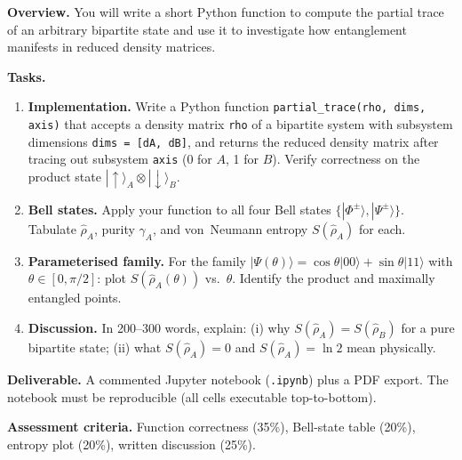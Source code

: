 \documentclass[11pt,a4paper]{article}
\begin{document}
\begin{tcolorbox}[ugprobbox, title={Project J2 --- Numerical Exploration of Partial Traces}]

\textbf{Overview.}
You will write a short Python function to compute the partial trace of an
arbitrary bipartite state and use it to investigate how entanglement
manifests in reduced density matrices.

\medskip\textbf{Tasks.}
\begin{enumerate}[leftmargin=1.8em, label=\textbf{\arabic*.}, itemsep=6pt]
  \item \textbf{Implementation.}
        Write a Python function \texttt{partial\_trace(rho, dims, axis)}
        that accepts a density matrix \texttt{rho} of a bipartite system
        with subsystem dimensions \texttt{dims = [dA, dB]}, and returns
        the reduced density matrix after tracing out subsystem \texttt{axis}
        (0 for $A$, 1 for $B$).
        Verify correctness on the product state
        $|\uparrow\rangle_A\otimes|\downarrow\rangle_B$.
  \item \textbf{Bell states.}
        Apply your function to all four Bell states
        $\{|\Phi^\pm\rangle,|\Psi^\pm\rangle\}$.
        Tabulate $\hat{\rho}_A$, purity $\gamma_A$, and von~Neumann entropy
        $S(\hat{\rho}_A)$ for each.
  \item \textbf{Parameterised family.}
        For the family
        $|\Psi(\theta)\rangle=\cos\theta|00\rangle+\sin\theta|11\rangle$
        with $\theta\in[0,\pi/2]$:
        plot $S(\hat{\rho}_A(\theta))$ vs.\ $\theta$.
        Identify the product and maximally entangled points.
  \item \textbf{Discussion.}
        In 200--300 words, explain: (i) why $S(\hat{\rho}_A)=S(\hat{\rho}_B)$
        for a pure bipartite state; (ii) what $S(\hat{\rho}_A)=0$ and
        $S(\hat{\rho}_A)=\ln 2$ mean physically.
\end{enumerate}

\medskip\textbf{Deliverable.}
A commented Jupyter notebook (\texttt{.ipynb}) plus a PDF export.
The notebook must be reproducible (all cells executable top-to-bottom).

\medskip\textbf{Assessment criteria.}
Function correctness (35\%), Bell-state table (20\%),
entropy plot (20\%), written discussion (25\%).
\end{tcolorbox}

\bigskip
\end{document}
